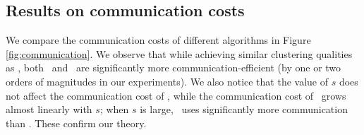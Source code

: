

\subsection{Results on communication costs} 
\begin{figure*}[!ht]
     \centering


     \caption{Comparisons on communication costs. In the message passing model, each site samples $5n$ edges; in each round of the algorithm in the blackboard model, all sites jointly sample $10n$ (in \twomoons~and \gauss) or $20n$ (in \sculpture) edges and the chain has length $18$. }
     \label{fig:communication}
\end{figure*}

We compare the communication costs of different algorithms in Figure \ref{fig:communication}. We observe that while achieving similar clustering qualities as \baseline, both \MM\ and \blackboard\ are significantly more communication-efficient (by one or two orders of magnitudes in our experiments). We also notice that the value of $s$ does not affect the communication cost of \blackboard, while the communication cost of \MM\ grows almost linearly with $s$; when $s$ is large, \MM\ uses significantly more communication than \blackboard. These confirm our theory.  %

